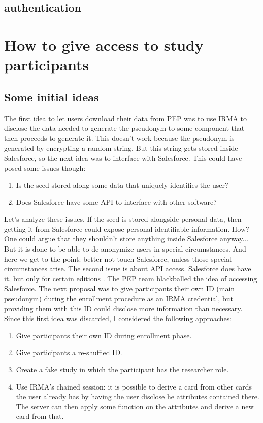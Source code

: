 \documentclass{report}
\begin{document}
\subsection{authentication}



\iffalse
\section{How to give access to study participants}
\subsection{Some initial ideas}
The first idea to let users download their data from PEP was to use IRMA to disclose the data needed to generate the pseudonym to some component that then proceeds to generate it.
This doesn't work because the pseudonym is generated by encrypting a random string. But this string gets stored inside Salesforce, so the next idea was to interface with
Salesforce. This could have posed some issues though:
\begin{enumerate}
		\item Is the seed stored along some data that uniquely identifies the user?
		\item Does Salesforce have some API to interface with other software?
\end{enumerate}
Let's analyze these issues. If the seed is stored alongside personal data, then getting it from Salesforce could expose personal identifiable information. How? One could argue that
they shouldn't store anything inside Salesforce anyway... But it is done to be able to de-anonymize users in special circumstances. And here we get to the point: better not touch
Salesforce, unless those special circumstances arise. The second issue is about API access. Salesforce does have it, but only for certain editions \cite{salesforce}. The PEP team
blackballed the idea of accessing Salesforce. The next proposal was to give participants their own ID (main pseudonym) during the enrollment procedure as an IRMA credential, but
providing them with this ID could disclose more information than necessary.
Since this first idea was discarded, I considered the following approaches:
\begin{enumerate}
		\item Give participants their own ID during enrollment phase.
		\item Give participants a re-shuffled ID.
		\item Create a fake study in which the participant has the researcher role.
		\item Use IRMA’s chained session: it is possible to derive a card from other cards the user already has by having the user disclose he attributes contained there. The server can then apply some function on the attributes and derive a new card from that.
\end{enumerate}
\end{document}
